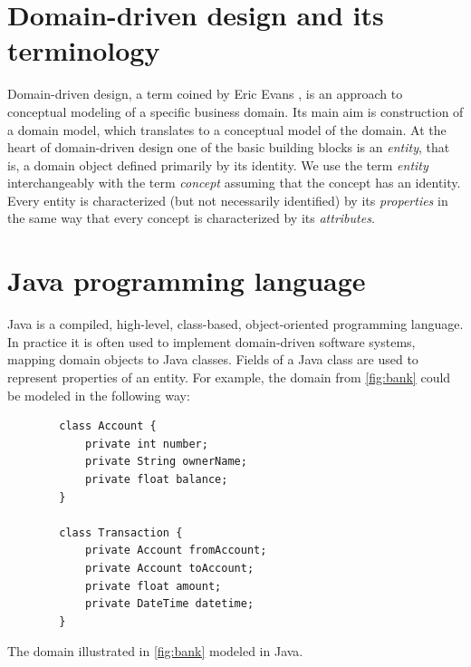 %

\section{Domain-driven design and its terminology}
Domain-driven design, a term coined by Eric Evans \cite{ddd}, is an approach to conceptual modeling of a specific business domain.
Its main aim is construction of a domain model, which translates to a conceptual model of the domain.
At the heart of domain-driven design one of the basic building blocks is an \textit{entity}, that is, a domain object defined primarily by its identity.
We use the term \textit{entity} interchangeably with the term \textit{concept} assuming that the concept has an identity. 
Every entity is characterized (but not necessarily identified) by its \textit{properties} in the same way that every concept is characterized by its \textit{attributes}.

\section{Java programming language}
Java \cite{java} is a compiled, high-level, class-based, object-oriented programming language.
In practice it is often used to implement domain-driven software systems, mapping domain objects to Java classes.
Fields of a Java class are used to represent properties of an entity.
For example, the domain from \ref{fig:bank} could be modeled in the following way:

\begin{listing}[H]
    \begin{verbatim}
        class Account {
            private int number;
            private String ownerName;
            private float balance;
        }

        class Transaction {
            private Account fromAccount;
            private Account toAccount;
            private float amount;
            private DateTime datetime;
        }
    \end{verbatim}
    \caption{The domain illustrated in \ref{fig:bank} modeled in Java.}
    \label{lst:bank}
\end{listing}

